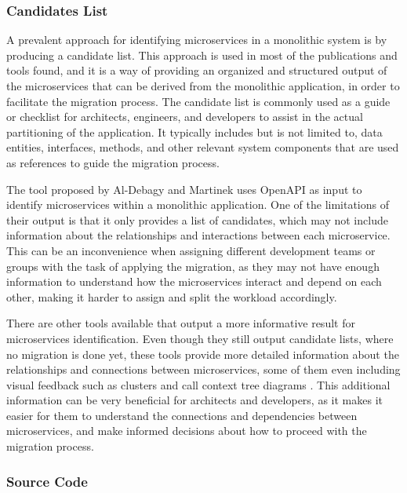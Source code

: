 \documentclass[conference]{IEEEtran}
\begin{document}
\subsubsection*{Candidates List}

A prevalent approach for identifying microservices in a monolithic system is by
producing a candidate list. This approach is used in most of the publications
and tools found, and it is a way of providing an organized and structured
output of the microservices that can be derived from the monolithic
application, in order to facilitate the migration process. The candidate list
is commonly used as a guide or checklist for architects, engineers, and
developers to assist in the actual partitioning of the application. It
typically includes but is not limited to, data entities, interfaces, methods,
and other relevant system components that are used as references to guide the
migration process.

The tool proposed by Al-Debagy and Martinek  uses OpenAPI as
input to identify microservices within a monolithic application. One of the
limitations of their output is that it only provides a list of candidates,
which may not include information about the relationships and interactions
between each microservice. This can be an inconvenience when assigning
different development teams or groups with the task of applying the migration,
as they may not have enough information to understand how the microservices
interact and depend on each other, making it harder to assign and split the
workload accordingly.

There are other tools available that output a more informative result for
microservices identification. Even though they still output candidate lists,
where no migration is done yet, these tools provide more detailed information
about the relationships and connections between microservices, some of them
even including visual feedback such as clusters and call context tree diagrams
. This additional information can be very beneficial
for architects and developers, as it makes it easier for them to understand the
connections and dependencies between microservices, and make informed decisions
about how to proceed with the migration process.

\subsubsection*{Source Code}
\end{document}
